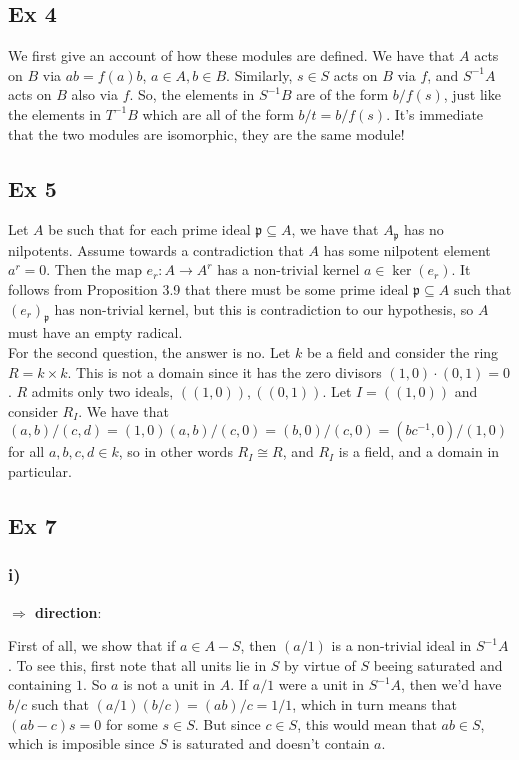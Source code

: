 \documentclass{article}
\theoremstyle{definition}
\begin{document}
\subsection*{Ex 4}

We first give an account of how these modules are defined. We have that $A$
acts on $B$ via $ab = f(a)b$, $a \in A, b \in B$. Similarly, $s \in S$ acts on
$B$ via $f$, and $S^{-1}A$ acts on $B$ also via $f$. So, the elements in
$S^{-1}B$ are of the form $b/f(s)$, just like the elements in $T^{-1}B$ which
are all of the form $b/t = b/f(s)$. It's immediate that the two modules are
isomorphic, they are the same module!


\subsection*{Ex 5}
Let $A$ be such that for each prime ideal $\mathfrak{p} \subseteq A$, we have
that $A_{\mathfrak{p}}$ has no nilpotents. Assume towards a contradiction that
$A$ has some nilpotent element $a^r = 0$. Then the map $e_r : A \to A^r$ has a
non-trivial kernel $a \in \ker(e_r)$. It follows from Proposition 3.9 that
there must be some prime ideal $\mathfrak{p} \subseteq A$ such that
$(e_r)_\mathfrak{p}$ has non-trivial kernel, but this is contradiction to our
hypothesis, so $A$ must have an empty radical. \\

For the second question, the answer is no. Let $k$ be a field and consider the
ring $R = k \times k$. This is not a domain since it has the zero divisors $(1,
0) \cdot (0, 1) = 0$. $R$ admits only two ideals, $((1, 0)), ((0, 1))$. Let $I
= ((1, 0))$ and consider $R_I$.  We have that $(a, b)/(c, d) = (1, 0)(a, b)/(c,
0) = (b, 0)/(c, 0) = (bc^{-1}, 0)/(1, 0)$ for all $a, b, c, d \in k$, so 
in other words $R_I \cong R$, and $R_I$ is a field, and a domain in particular.

\subsection*{Ex 7}
\subsubsection*{i)}

\textbf{$\Rightarrow$ direction}:

First of all, we show that if $a \in A - S$, then $(a/1)$ is a non-trivial
ideal in $S^{-1}A$. To see this, first note that all units lie in $S$
by virtue of $S$ beeing saturated and containing $1$. So $a$ is 
not a unit in $A$. If $a/1$ were a unit in $S^{-1}A$, then we'd have 
$b/c$ such that $(a/1)(b/c) = (ab)/c = 1/1$, which in turn means that
$(ab - c)s = 0$ for some $s \in S$. But since $c \in S$,
this would mean that $ab \in S$, which is imposible since $S$ is saturated 
and doesn't contain $a$. \\
\end{document}
